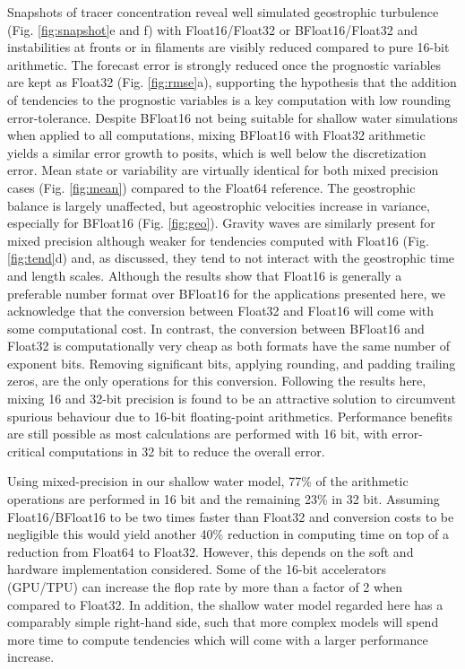 Snapshots of tracer concentration reveal well simulated geostrophic turbulence
(Fig. \ref{fig:snapshot}e and f) with Float16/Float32 or BFloat16/Float32 and
instabilities at fronts or in filaments are visibly reduced compared to pure
16-bit arithmetic. The forecast error is strongly reduced once the prognostic
variables are kept as Float32 (Fig. \ref{fig:rmse}a), supporting the hypothesis
that the addition of tendencies to the prognostic variables is a key computation
with low rounding error-tolerance. Despite BFloat16 not being suitable for shallow
water simulations when applied to all computations, mixing BFloat16 with Float32
arithmetic yields a similar error growth to posits, which is well below the
discretization error. Mean state or variability are virtually identical for both
mixed precision cases (Fig. \ref{fig:mean}) compared to the Float64 reference.
The geostrophic balance is largely unaffected, but ageostrophic velocities increase
in variance, especially for BFloat16 (Fig. \ref{fig:geo}). Gravity waves are
similarly present for mixed precision although weaker for tendencies computed
with Float16 (Fig. \ref{fig:tend}d) and, as discussed, they tend to not interact
with the geostrophic time and length scales. Although the results show that Float16
is generally a preferable number format over BFloat16 for the applications presented
here, we acknowledge that the conversion between Float32 and Float16 will come
with some computational cost. In contrast, the conversion between BFloat16 and
Float32 is computationally very cheap as both formats have the same number of
exponent bits. Removing significant bits, applying rounding, and padding
trailing zeros, are the only operations for this conversion. Following the
results here, mixing 16 and 32-bit precision is found to be an attractive solution
to circumvent spurious behaviour due to 16-bit floating-point arithmetics.
Performance benefits are still possible as most calculations are performed with
16 bit, with error-critical computations in 32 bit to reduce the overall error.

Using mixed-precision in our shallow water model, 77\% of the arithmetic
operations are performed in 16 bit and the remaining 23\% in 32 bit. Assuming
Float16/BFloat16 to be two times faster than Float32 and conversion costs to
be negligible this would yield another 40\% reduction in computing time on top
of a reduction from Float64 to Float32. However, this depends on the soft
and hardware implementation considered. Some of the 16-bit accelerators (GPU/TPU)
can increase the flop rate by more than a factor of 2 when compared to Float32.
In addition, the shallow water model regarded here has a comparably simple
right-hand side, such that more complex models will spend more time to compute
tendencies which will come with a larger performance increase.

